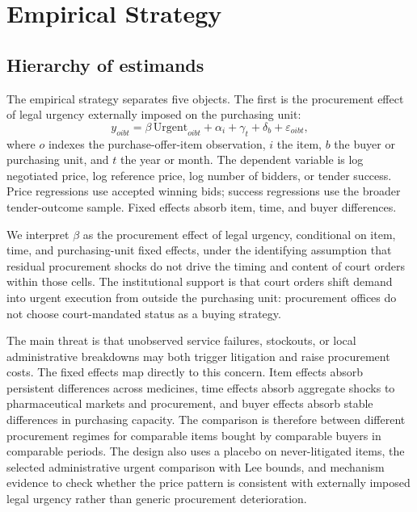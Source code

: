 \section{Empirical Strategy}
\label{sec:framework}

\subsection{Hierarchy of estimands}
\label{subsec:uo}

The empirical strategy separates five objects. The first is the
procurement effect of legal urgency externally imposed on the
purchasing unit:
\begin{equation}
y_{oibt}=\beta\,\text{Urgent}_{oibt}+\alpha_i+\gamma_t+\delta_b+\varepsilon_{oibt},
\label{eq:urgent_ordinary}
\end{equation}
where $o$ indexes the purchase-offer-item observation, $i$ the item,
$b$ the buyer or purchasing unit, and $t$ the year or month. The
dependent variable is log negotiated price, log reference price, log
number of bidders, or tender success. Price regressions use accepted
winning bids; success regressions use the broader tender-outcome
sample. Fixed effects absorb item, time, and buyer differences.

We interpret $\beta$ as the procurement effect of legal urgency,
conditional on item, time, and purchasing-unit fixed effects, under
the identifying assumption that residual procurement shocks do not
drive the timing and content of court orders within those cells.
The institutional support is that court orders shift demand into
urgent execution from outside the purchasing unit: procurement offices
do not choose court-mandated status as a buying strategy.

The main threat is that unobserved service failures, stockouts, or
local administrative breakdowns may both trigger litigation and raise
procurement costs. The fixed effects map directly to this concern. Item effects
absorb persistent differences across medicines, time effects absorb
aggregate shocks to pharmaceutical markets and procurement, and buyer
effects absorb stable differences in purchasing capacity. The
comparison is therefore between different procurement regimes for
comparable items bought by comparable buyers in comparable periods.
The design also uses a placebo on never-litigated items, the selected
administrative urgent comparison with Lee bounds, and mechanism
evidence to check whether the price pattern is consistent with
externally imposed legal urgency rather than generic procurement
deterioration.

